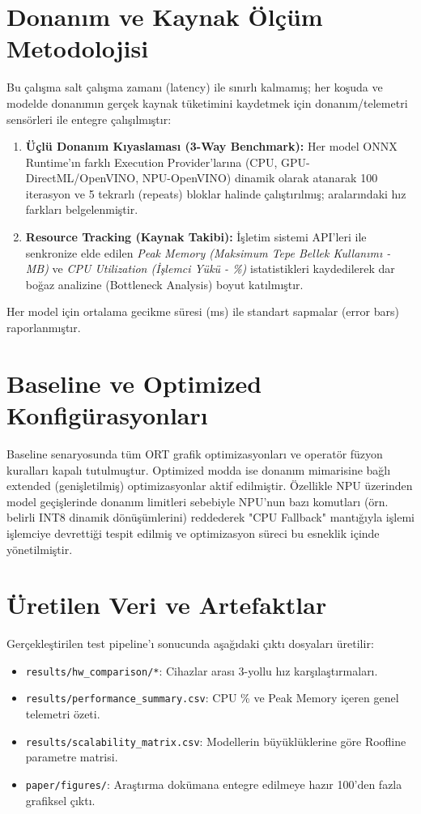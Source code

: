 \section{Donanım ve Kaynak Ölçüm Metodolojisi}
Bu çalışma salt çalışma zamanı (latency) ile sınırlı kalmamış; her koşuda ve modelde donanımın gerçek kaynak tüketimini kaydetmek için donanım/telemetri sensörleri ile entegre çalışılmıştır:
\begin{enumerate}
    \item \textbf{Üçlü Donanım Kıyaslaması (3-Way Benchmark):} Her model ONNX Runtime'ın farklı Execution Provider'larına (CPU, GPU-DirectML/OpenVINO, NPU-OpenVINO) dinamik olarak atanarak 100 iterasyon ve 5 tekrarlı (repeats) bloklar halinde çalıştırılmış; aralarındaki hız farkları belgelenmiştir.
    \item \textbf{Resource Tracking (Kaynak Takibi):} İşletim sistemi API'leri ile senkronize elde edilen \textit{Peak Memory (Maksimum Tepe Bellek Kullanımı - MB)} ve \textit{CPU Utilization (İşlemci Yükü - \%)} istatistikleri kaydedilerek dar boğaz analizine (Bottleneck Analysis) boyut katılmıştır.
\end{enumerate}

Her model için ortalama gecikme süresi (ms) ile standart sapmalar (error bars) \cite{onnxruntime} raporlanmıştır.

\section{Baseline ve Optimized Konfigürasyonları}
Baseline senaryosunda tüm ORT grafik optimizasyonları ve operatör füzyon kuralları kapalı tutulmuştur.
Optimized modda ise donanım mimarisine bağlı extended (genişletilmiş) optimizasyonlar aktif edilmiştir. 
Özellikle NPU üzerinden model geçişlerinde donanım limitleri sebebiyle NPU'nun bazı komutları (örn. belirli INT8 dinamik dönüşümlerini) reddederek "CPU Fallback" mantığıyla işlemi işlemciye devrettiği tespit edilmiş ve optimizasyon süreci bu esneklik içinde yönetilmiştir.

\section{Üretilen Veri ve Artefaktlar}
Gerçekleştirilen test pipeline'ı sonucunda aşağıdaki çıktı dosyaları üretilir:
\begin{itemize}
	\item \texttt{results/hw\_comparison/*}: Cihazlar arası 3-yollu hız karşılaştırmaları.
	\item \texttt{results/performance\_summary.csv}: CPU \% ve Peak Memory içeren genel telemetri özeti.
	\item \texttt{results/scalability\_matrix.csv}: Modellerin büyüklüklerine göre Roofline parametre matrisi.
	\item \texttt{paper/figures/}: Araştırma dokümana entegre edilmeye hazır 100'den fazla grafiksel çıktı.
\end{itemize}